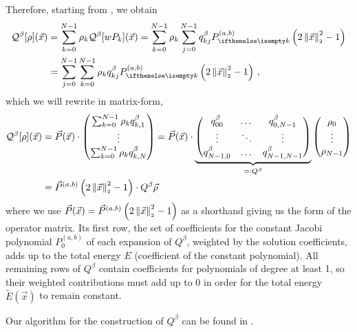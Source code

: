 Therefore, starting from , we obtain
\begin{align*}
  \mathcal{Q}^\beta[\rho](\vec{x}) & = \sum_{k=0}^{N-1} \rho_k \mathcal{Q}^\beta[wP_k](\vec{x}) = \sum_{k=0}^{N-1} \rho_k \sum_{j=0}^{N-1} q^{\beta}_{kj} \jacobi{x} \\
                                   & = \sum_{j=0}^{N-1} \sum_{k=0}^{N-1} \rho_k q^{\beta}_{kj} \jacobi{x}\,,
\end{align*}
which we will rewrite in matrix-form,
\begin{align*}
  \mathcal{Q}^\beta[\rho](\vec{x}) & = \vec{P}(\vec{x}) \cdot
  \begin{pmatrix}
    \sum_{k=0}^{N-1} \rho_k q^{\beta}_{k,1} \\
    \vdots                                  \\
    \sum_{k=0}^{N-1} \rho_k q^{\beta}_{k,N}
  \end{pmatrix} = \vec{P}(\vec{x}) \cdot
  \underbrace{
    \begin{pmatrix}
      q^{\beta}_{00}    & \dots  & q^{\beta}_{0,N-1}   \\
      \vdots            & \ddots & \vdots              \\
      q^{\beta}_{N-1,0} & \dots  & q^{\beta}_{N-1,N-1} \\
    \end{pmatrix}
  }_{=: Q^\beta}
  \begin{pmatrix}
    \rho_0 \\
    \vdots \\
    \rho_{N-1}
  \end{pmatrix}                                                              \\
                                   & = \vec{P}^{(a, b)}\left(2 \left\lVert\vec{x}\right\rVert_{\scriptscriptstyle 2}^2 - 1\right) \cdot Q^\beta \vec{\rho}
\end{align*}
where we use $\vec{P}(\vec{x}) = \vec{P}^{(a, b)}\left(2 \left\lVert\vec{x}\right\rVert_{\scriptscriptstyle 2}^2 - 1\right)$ as a shorthand giving us the form of the operator matrix.
Its first row, the set of coefficients for the constant Jacobi polynomial $P_0^{(a,b)}$ of each expansion of $Q^\beta$, weighted by the solution coefficients, adds up to the total energy $E$ (coefficient of the constant polynomial).
All remaining rows of $Q^\beta$ contain coefficients for polynomials of degree at least 1, so their weighted contributions must add up to 0 in order for the total energy $\tilde{E}(\vec{x})$ to remain constant.

Our algorithm for the construction of $Q^\beta$ can be found in .

